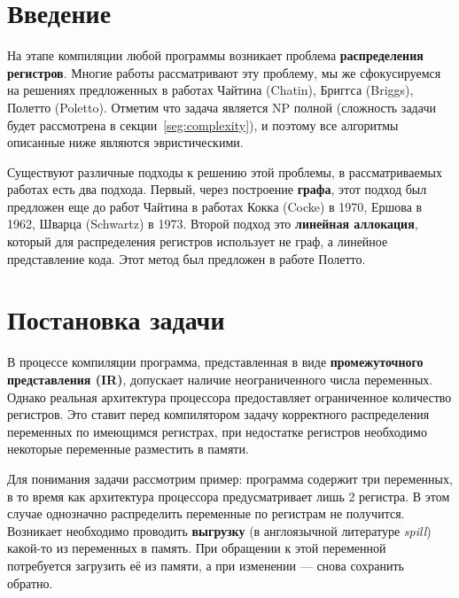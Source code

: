 



\section{Введение}

На этапе компиляции любой программы возникает проблема \textbf{распределения регистров}. %
Многие работы рассматривают эту проблему, мы же сфокусируемся на решениях предложенных в
работах Чайтина (Chatin)\cite{chaitin1982}, Бриггса (Briggs)\cite{briggs1994}, Полетто (Poletto)\cite{poletto1999}. %
Отметим что задача является NP полной (сложность задачи будет рассмотрена в секции~\ref{seg:complexity}),
и поэтому все алгоритмы описанные ниже являются эвристическими.

Существуют различные подходы к решению этой проблемы, в рассматриваемых работах есть два подхода.
Первый, через построение \textbf{графа}, этот подход был предложен еще до работ Чайтина в работах Кокка
(Cocke) в 1970\cite{cocke1970}, Ершова в 1962\cite{ershov1962}, Шварца (Schwartz) в 1973\cite{schwartz1973}. %
Второй подход это \textbf{линейная аллокация}, который для распределения регистров использует не граф,
а линейное представление кода. Этот метод был предложен в работе Полетто.

\section{Постановка задачи}

В процессе компиляции программа, представленная в виде \textbf{промежуточного представления (IR)}, допускает
наличие неограниченного числа переменных. Однако реальная архитектура процессора предоставляет ограниченное
количество регистров. Это ставит перед компилятором задачу корректного распределения переменных по имеющимся
регистрах, при недостатке регистров необходимо некоторые переменные разместить в памяти. %

Для понимания задачи рассмотрим пример: программа содержит три переменных, в то время как архитектура
процессора предусматривает лишь 2 регистра. В этом случае однозначно распределить переменные по регистрам
не получится. Возникает необходимо проводить \textbf{выгрузку} (в англоязычной литературе \textit{spill})
какой-то из переменных в память. При обращении к этой переменной потребуется загрузить
её из памяти, а при изменении — снова сохранить обратно.


